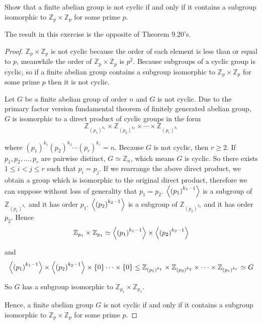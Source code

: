 \newpage
\begin{exercise}
    Show that a finite abelian group is not cyclic if and only if it contains a subgroup isomorphic to $\mathbb{Z}_{p}\times\mathbb{Z}_{p}$ for some prime $p$.
\end{exercise}

The result in this exercise is the opposite of Theorem 9.20's.

\begin{proof}
    $\mathbb{Z}_{p}\times\mathbb{Z}_{p}$ is not cyclic because the order of each element is less than or equal to $p$, meanwhile the order of $\mathbb{Z}_{p}\times\mathbb{Z}_{p}$ is $p^{2}$. Because subgroups of a cyclic group is cyclic, so if a finite abelian group contains a subgroup isomorphic to $\mathbb{Z}_{p}\times\mathbb{Z}_{p}$ for some prime $p$ then it is not cyclic.

    Let $G$ be a finite abelian group of order $n$ and $G$ is not cyclic. Due to the primary factor version fundamental theorem of finitely generated abelian group, $G$ is isomorphic to a direct product of cyclic groups in the form
    \[
        \mathbb{Z}_{{(p_{1})}^{k_{1}}}
        \times
        \mathbb{Z}_{{(p_{2})}^{k_{2}}}
        \times
        \cdots
        \times
        \mathbb{Z}_{{(p_{r})}^{k_{r}}}
    \]

    where ${(p_{1})}^{k_{1}}{(p_{2})}^{k_{2}}\cdots {(p_{r})}^{k_{r}} = n$. Because $G$ is not cyclic, then $r\geq 2$. If $p_{1}, p_{2}, \ldots, p_{r}$ are pairwise distinct, $G \simeq \mathbb{Z}_{n}$, which means $G$ is cyclic. So there exists $1\leq i < j\leq r$ such that $p_{i} = p_{j}$. If we rearrange the above direct product, we obtain a group which is isomorphic to the original direct product, therefore we can suppose without loss of generality that $p_{1} = p_{2}$. $\left\langle{{(p_{1})}^{k_{1} - 1}}\right\rangle$ is a subgroup of $\mathbb{Z}_{{(p_{1})}^{k_{1}}}$ and it has order $p_{1}$. $\left\langle{{(p_{2})}^{k_{2} - 1}}\right\rangle$ is a subgroup of $\mathbb{Z}_{{(p_{2})}^{k_{2}}}$ and it has order $p_{2}$. Hence
    \[
        \mathbb{Z}_{p_{1}} \times \mathbb{Z}_{p_{1}} \simeq
        \left\langle{{(p_{1})}^{k_{1} - 1}}\right\rangle \times \left\langle{{(p_{2})}^{k_{2} - 1}}\right\rangle
    \]

    and
    \[
        \left\langle{{(p_{1})}^{k_{1} - 1}}\right\rangle
        \times
        \left\langle{{(p_{2})}^{k_{2} - 1}}\right\rangle
        \times
        \{0\}
        \cdots
        \times
        \{0\}
        \leq
        \mathbb{Z}_{{(p_{1})}^{k_{1}}}
        \times
        \mathbb{Z}_{{(p_{2})}^{k_{2}}}
        \times
        \cdots
        \times
        \mathbb{Z}_{{(p_{r})}^{k_{r}}} \simeq G
    \]

    So $G$ has a subgroup isomorphic to $\mathbb{Z}_{p_{1}} \times \mathbb{Z}_{p_{1}}$.

    Hence, a finite abelian group $G$ is not cyclic if and only if it contains a subgroup isomorphic to $\mathbb{Z}_{p}\times\mathbb{Z}_{p}$ for some prime $p$.
\end{proof}

